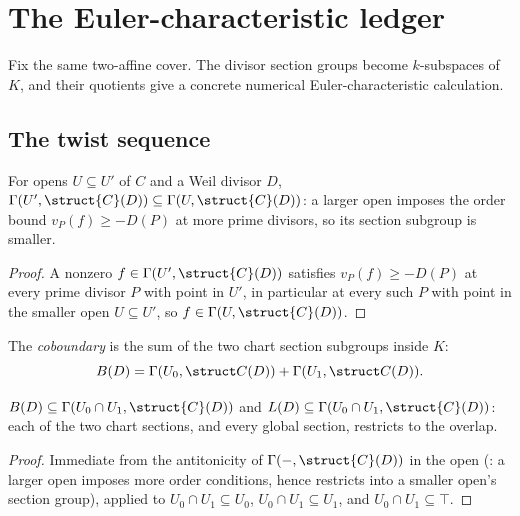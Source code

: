 \section{The Euler-characteristic ledger}
\label{sec:RiemannRoch_Adelic_chi}

Fix the same two-affine cover.  The divisor section groups become
\(k\)-subspaces of \(K\), and their quotients give a concrete numerical
Euler-characteristic calculation.

\subsection{The twist sequence}

\begin{lemma}
  \label{lem:adelic_sectionOfDivisor_antitone_open}
  \leanok
  For opens \(U \subseteq U'\) of \(C\) and a Weil divisor \(D\),
  \(\Gamma(U', \struct{C}(D)) \subseteq \Gamma(U, \struct{C}(D))\): a
  larger open imposes the order bound \(v_P(f) \ge -D(P)\) at more
  prime divisors, so its section subgroup is smaller.
\end{lemma}
\begin{proof}
  \leanok
  A nonzero \(f \in \Gamma(U', \struct{C}(D))\) satisfies
  \(v_P(f) \ge -D(P)\) at every prime divisor \(P\) with point in
  \(U'\), in particular at every such \(P\) with point in the smaller
  open \(U \subseteq U'\), so \(f \in \Gamma(U, \struct{C}(D))\).
\end{proof}

\begin{definition}
  \label{def:adelic_coboundary}
  \leanok
  The \emph{coboundary} is the sum of the two chart section subgroups
  inside \(K\):
  \[
    B(D)=\Gamma(U_0,\struct C(D))+\Gamma(U_1,\struct C(D)).
  \]
\end{definition}

\begin{lemma}
  \label{lem:adelic_coboundary_le_overlap}
  \leanok
  \(B(D) \subseteq \Gamma(U_0 \cap U_1, \struct{C}(D))\) and
  \(L(D) \subseteq \Gamma(U_0 \cap U_1, \struct{C}(D))\): each of the two
  chart sections, and every global section, restricts to the overlap.
\end{lemma}
\begin{proof}
  \leanok
  Immediate from the antitonicity of \(\Gamma(-, \struct{C}(D))\) in the
  open (: a larger open
  imposes more order conditions, hence restricts into a smaller open's
  section group), applied to \(U_0 \cap U_1 \subseteq U_0\), \(U_0 \cap
  U_1 \subseteq U_1\), and \(U_0 \cap U_1 \subseteq \top\).
\end{proof}

